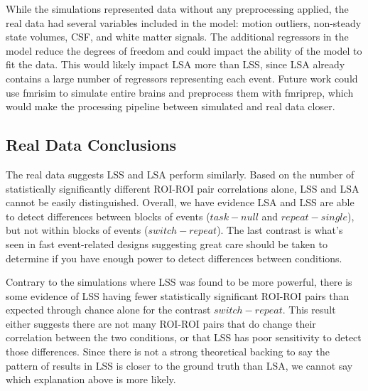 \documentclass[10pt,letterpaper]{article}
\begin{document}
While the simulations represented data without any preprocessing applied,
the real data had several variables included in the model: motion outliers, non-steady state volumes,
CSF, and white matter signals.
The additional regressors in the model reduce the degrees of freedom
and could impact the ability of the model to fit the data.
This would likely impact LSA more than LSS, since LSA already contains
a large number of regressors representing each event.
Future work could use fmrisim to simulate entire brains and preprocess them with fmriprep,
which would make the processing pipeline between simulated and real data closer.

\subsection*{Real Data Conclusions}
\label{discussion:taskswitching-conclusions}

The real data suggests LSS and LSA perform similarly.
Based on the number of statistically significantly different ROI-ROI pair correlations alone,
LSS and LSA cannot be easily distinguished.
Overall, we have evidence LSA and LSS are able to detect differences between
blocks of events ($task - null$ and $repeat - single$), but not within blocks of events ($switch - repeat$).
The last contrast is what's seen in fast event-related designs suggesting
great care should be taken to determine if you have enough power to detect differences
between conditions.

Contrary to the simulations where LSS was found to be more powerful,
there is some evidence of LSS having fewer statistically significant ROI-ROI pairs than expected through chance alone
for the contrast $switch - repeat$.
This result either suggests there are not many ROI-ROI pairs that do change their correlation
between the two conditions, or that LSS has poor sensitivity to detect those differences.
Since there is not a strong theoretical backing to say the pattern of results
in LSS is closer to the ground truth than LSA, we cannot say which
explanation above is more likely.
\end{document}

